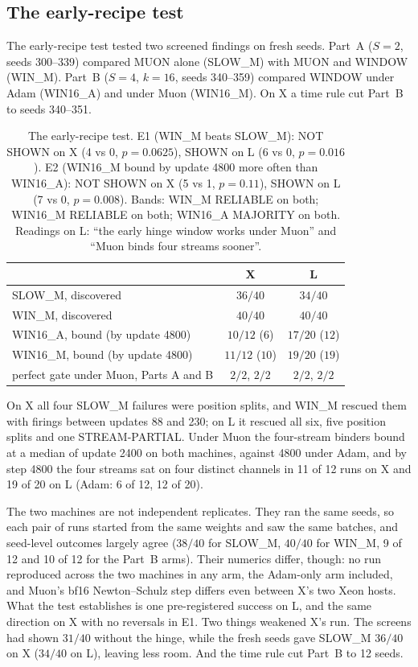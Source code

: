 \documentclass[11pt]{article}
\newcommand{\arm}[1]{\textsf{#1}}
\begin{document}
\subsection{The early-recipe test}
\label{sec:early}

The early-recipe test tested two screened findings on fresh seeds. Part~A ($S = 2$, seeds 300--339) compared MUON alone (\arm{SLOW\_M}) with MUON and WINDOW (\arm{WIN\_M}). Part~B ($S = 4$, $k = 16$, seeds 340--359) compared WINDOW under Adam (\arm{WIN16\_A}) and under Muon (\arm{WIN16\_M}). On X a time rule cut Part~B to seeds 340--351.

\begin{table}[h]
\centering
\small
\begin{tabular}{@{}lcc@{}}
\toprule
 & X & L\\
\midrule
\arm{SLOW\_M}, discovered & $36/40$ & $34/40$\\
\arm{WIN\_M}, discovered & $40/40$ & $40/40$\\
\arm{WIN16\_A}, bound (by update 4800) & $10/12$ ($6$) & $17/20$ ($12$)\\
\arm{WIN16\_M}, bound (by update 4800) & $11/12$ ($10$) & $19/20$ ($19$)\\
perfect gate under Muon, Parts A and B & $2/2$, $2/2$ & $2/2$, $2/2$\\
\bottomrule
\end{tabular}
\caption{The early-recipe test. E1 (\arm{WIN\_M} beats \arm{SLOW\_M}): NOT SHOWN on X (4 vs 0, $p = 0.0625$), SHOWN on L (6 vs 0, $p = 0.016$). E2 (\arm{WIN16\_M} bound by update 4800 more often than \arm{WIN16\_A}): NOT SHOWN on X (5 vs 1, $p = 0.11$), SHOWN on L (7 vs 0, $p = 0.008$). Bands: \arm{WIN\_M} RELIABLE on both; \arm{WIN16\_M} RELIABLE on both; \arm{WIN16\_A} MAJORITY on both. Readings on L: ``the early hinge window works under Muon'' and ``Muon binds four streams sooner''.}
\label{tab:early}
\end{table}

\noindent
On X all four \arm{SLOW\_M} failures were position splits, and \arm{WIN\_M} rescued them with firings between updates 88 and 230; on L it rescued all six, five position splits and one STREAM-PARTIAL. Under Muon the four-stream binders bound at a median of update 2400 on both machines, against 4800 under Adam, and by step 4800 the four streams sat on four distinct channels in 11 of 12 runs on X and 19 of 20 on L (Adam: 6 of 12, 12 of 20).

The two machines are not independent replicates. They ran the same seeds, so each pair of runs started from the same weights and saw the same batches, and seed-level outcomes largely agree ($38/40$ for \arm{SLOW\_M}, $40/40$ for \arm{WIN\_M}, 9 of 12 and 10 of 12 for the Part~B arms). Their numerics differ, though: no run reproduced across the two machines in any arm, the Adam-only arm included, and Muon's bf16 Newton--Schulz step differs even between X's two Xeon hosts. What the test establishes is one pre-registered success on L, and the same direction on X with no reversals in E1. Two things weakened X's run. The screens had shown $31/40$ without the hinge, while the fresh seeds gave \arm{SLOW\_M} $36/40$ on X ($34/40$ on L), leaving less room. And the time rule cut Part~B to 12 seeds.
\end{document}
